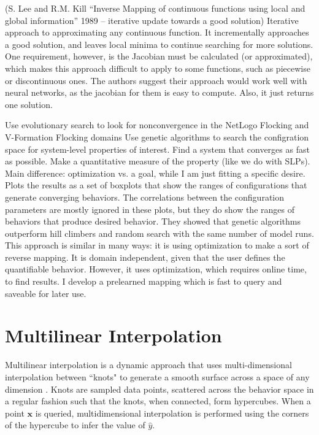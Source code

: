 (S. Lee and R.M. Kill ``Inverse Mapping of continuous functions using local and global information'' 1989 -- iterative update towards a good solution)
Iterative approach to approximating any continuous function.
It incrementally approaches a good solution, and leaves local minima to continue searching for more solutions.
One requirement, however, is the Jacobian must be calculated (or approximated), which makes this approach difficult to apply to some functions, such as piecewise or discontinuous ones.
The authors suggest their approach would work well with neural networks, as the jacobian for them is easy to compute.
Also, it just returns one solution.

Use evolutionary search to look for nonconvergence in the NetLogo Flocking and V-Formation Flocking domains \cite{stonedahl}
Use genetic algorithms to search the configration space for system-level properties of interest.
Find a system that converges as fast as possible.
Make a quantitative measure of the property (like we do with SLPs).
Main difference: optimization vs. a goal, while I am just fitting a specific desire.
Plots the results as a set of boxplots that show the ranges of configurations that generate converging behaviors.
The correlations between the configuration parameters are mostly ignored in these plots, but they do show the ranges of behaviors that produce desired behavior.
They showed that genetic algorithms outperform hill climbers and random search with the same number of model runs.
This approach is similar in many ways: it is using optimization to make a sort of reverse mapping.
It is domain independent, given that the user defines the quantifiable behavior.
However, it uses optimization, which requires online time, to find results.
I develop a prelearned mapping which is fast to query and saveable for later use.


\section{Multilinear Interpolation}
\label{sec:multilinear}

Multilinear interpolation is a dynamic approach that uses multi-dimensional interpolation between ``knots" to generate a smooth surface across a space of any dimension \cite{davies1997multidimensional}.
Knots are sampled data points, scattered across the behavior space in a regular fashion such that the knots, when connected, form hypercubes.
When a point $\mathbf x$ is queried, multidimensional interpolation is performed using the corners of the hypercube to infer the value of $\hat y$.

